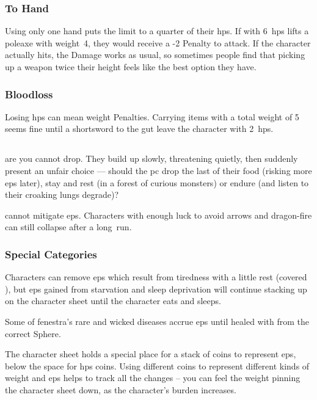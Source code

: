 \begin{multicols}{2}
\subsubsection{To Hand}
Using only one hand puts the limit to a quarter of their \glspl{hp}.
If  with 6~\glspl{hp} lifts a poleaxe with \gls{weight}~4, they would receive a -2 Penalty to attack.
If the character actually hits, the Damage works as usual, so sometimes people find that picking up a weapon twice their height feels like the best option they have.

\subsubsection{Bloodloss}

Losing \glspl{hp} can mean \Gls{weight} Penalties.
Carrying items with a total \gls{weight} of 5 seems fine until a shortsword to the gut leave the character with 2~\glspl{hp}.

\subsection{}
\label{ep}

 are  you cannot drop.
They build up slowly, threatening quietly, then suddenly present an unfair choice --- should the \gls{pc} drop the last of their food (risking more \glspl{ep} later), stay and rest (in a forest of curious monsters) or endure (and listen to their croaking lungs degrade)?

 cannot mitigate \glspl{ep}.
Characters with enough luck to avoid arrows and dragon-fire can still collapse after a long~run.

\subsubsection{Special Categories}

Characters can remove \glspl{ep} which result from tiredness with a little rest (covered ), but \glspl{ep} gained from starvation and sleep deprivation will continue stacking up on the character sheet until the character eats and sleeps.

Some of \gls{fenestra}'s rare and wicked diseases accrue \glspl{ep} until healed with  from the correct Sphere.

The character sheet holds a special place for a stack of coins to represent \glspl{ep}, below the space for \glspl{hp} coins.
Using different coins to represent different kinds of \gls{weight} and \glspl{ep} helps to track all the changes -- you can feel the weight pinning the character sheet down, as the character's burden increases.

\end{multicols}

